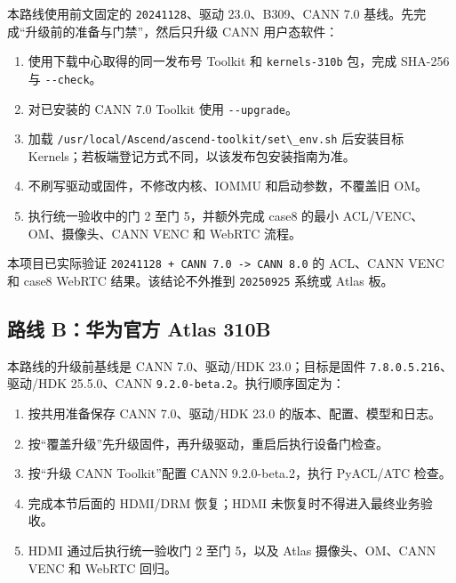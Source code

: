 本路线使用前文固定的 \passthrough{\lstinline!20241128!}、驱动
23.0、B309、CANN 7.0 基线。先完成``升级前的准备与门禁''，然后只升级 CANN
用户态软件：

\begin{enumerate}
\def\labelenumi{\arabic{enumi}.}
\tightlist
\item
  使用下载中心取得的同一发布号 Toolkit 和
  \passthrough{\lstinline!kernels-310b!} 包，完成 SHA-256 与
  \passthrough{\lstinline!--check!}。
\item
  对已安装的 CANN 7.0 Toolkit 使用 \passthrough{\lstinline!--upgrade!}。
\item
  加载
  \passthrough{\lstinline!/usr/local/Ascend/ascend-toolkit/set\_env.sh!}
  后安装目标 Kernels；若板端登记方式不同，以该发布包安装指南为准。
\item
  不刷写驱动或固件，不修改内核、IOMMU 和启动参数，不覆盖旧 OM。
\item
  执行统一验收中的门 2 至门 5，并额外完成 case8 的最小
  ACL/VENC、OM、摄像头、CANN VENC 和 WebRTC 流程。
\end{enumerate}

本项目已实际验证
\passthrough{\lstinline!20241128 + CANN 7.0 -> CANN 8.0!} 的 ACL、CANN
VENC 和 case8 WebRTC 结果。该结论不外推到
\passthrough{\lstinline!20250925!} 系统或 Atlas 板。

\subsection{路线 B：华为官方 Atlas
310B}\label{ux8defux7ebf-bux534eux4e3aux5b98ux65b9-atlas-310b}

本路线的升级前基线是 CANN 7.0、驱动/HDK 23.0；目标是固件
\passthrough{\lstinline!7.8.0.5.216!}、驱动/HDK 25.5.0、CANN
\passthrough{\lstinline!9.2.0-beta.2!}。执行顺序固定为：

\begin{enumerate}
\def\labelenumi{\arabic{enumi}.}
\tightlist
\item
  按共用准备保存 CANN 7.0、驱动/HDK 23.0 的版本、配置、模型和日志。
\item
  按``覆盖升级''先升级固件，再升级驱动，重启后执行设备门检查。
\item
  按``升级 CANN Toolkit''配置 CANN 9.2.0-beta.2，执行 PyACL/ATC 检查。
\item
  完成本节后面的 HDMI/DRM 恢复；HDMI 未恢复时不得进入最终业务验收。
\item
  HDMI 通过后执行统一验收门 2 至门 5，以及 Atlas 摄像头、OM、CANN VENC
  和 WebRTC 回归。
\end{enumerate}

